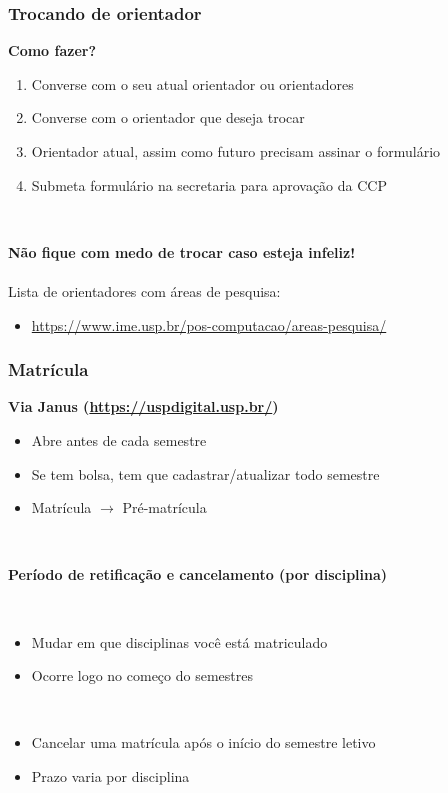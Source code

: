 \documentclass{beamer}
\begin{document}
\begin{frame}
  \frametitle{Trocando de orientador}

  \textbf{Como fazer?}
  \begin{enumerate}
    \item Converse com o seu atual orientador ou orientadores
    \item Converse com o orientador que deseja trocar
    \item Orientador atual, assim como futuro precisam assinar o formulário
    \item Submeta formulário na secretaria para aprovação da CCP
  \end{enumerate}~\\\pause

  \textbf{Não fique com medo de trocar caso esteja infeliz!}\\~\\

  Lista de orientadores com áreas de pesquisa:
  \begin{itemize}
    \item \small\url{https://www.ime.usp.br/pos-computacao/areas-pesquisa/}
  \end{itemize}
\end{frame}

\begin{frame}
  \frametitle{Matrícula}

  \textbf{Via Janus (\url{https://uspdigital.usp.br/})}
  \begin{itemize}
    \item Abre antes de cada semestre
    \item Se tem bolsa, tem que cadastrar/atualizar todo semestre
    \item Matrícula $\to$ Pré-matrícula
  \end{itemize}~\\\pause

  \textbf{Período de retificação e cancelamento (por disciplina)}
  \begin{description}[Cancelamento]
    \item[Retificação:]~\\
      \begin{itemize}
        \item Mudar em que disciplinas você está matriculado
        \item Ocorre logo no começo do semestres
      \end{itemize}\pause
    \item[Cancelamento:]~\\
      \begin{itemize}
        \item Cancelar uma matrícula após o início do semestre letivo
        \item Prazo varia por disciplina
      \end{itemize}
  \end{description}
\end{frame}
\end{document}
